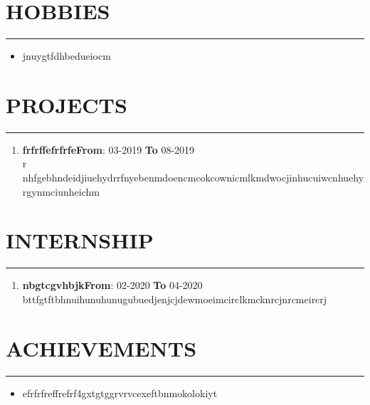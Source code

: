 \documentclass{article}
\begin{document}
\section*{\large{\uppercase{Hobbies}}}
\hrule
\vspace{3pt}
\begin{itemize}[noitemsep,nolistsep]
			\item jnuygtfdhbedueiocm
											
\end{itemize}
\vspace{3pt}
\section*{\large{\uppercase{projects}}}
\hrule
\vspace{3pt}

\begin{enumerate}
 
		\item {\textbf{frfrffefrfrfe}}\hfill {\textbf{From}}: 03-2019 {\textbf{To}} 08-2019\\
	r nhfgebhndeidjiuehydrrfnyebenmdoencmcokcownicmlkmdwocjinhucuiwcnhuehyrgynmciunheichm
	 
	 
	 
	\end{enumerate}
\vspace{3pt}
\section*{\large{\uppercase{Internship}}}
\hrule
\vspace{3pt}
\begin{enumerate}
 
		\item {\textbf{nbgtcgvhbjk}}\hfill {\textbf{From}}: 02-2020 {\textbf{To}} 04-2020\\
	bttfgtftbhnuihunuhunugubuedjenjcjdewmoeimcirclkmcknrcjnrcmeircrj
	 
	 
	 
	\end{enumerate}
\vspace{3pt}
\section*{\large{\uppercase{achievements}}}
\hrule
\vspace{3pt}
\begin{itemize}[noitemsep,nolistsep]
			\item efrfrfreffrefrf4gxtgtggrvrvcexeftbnmokolokiyt
					\end{itemize}
\vspace{3pt}
\end{document}

